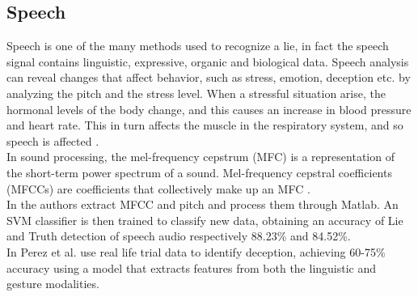 \documentclass[LaM,binding=0.6cm,english,noexaminfo]{sapthesis}
\begin{document}
\subsection*{Speech}
Speech is one of the many methods used to recognize a lie, in fact the speech signal contains linguistic, expressive, organic and biological data. Speech analysis can reveal changes that affect behavior, such as stress, emotion, deception etc. by analyzing the pitch and the stress level. When a stressful situation arise, the hormonal levels of the body change, and this causes an increase in blood pressure and heart rate. This in turn affects the muscle in the respiratory system, and so speech is affected \cite{norena}. \\
 In sound processing, the mel-frequency cepstrum (MFC) is a representation of the short-term power spectrum of a sound. Mel-frequency cepstral coefficients (MFCCs) are coefficients that collectively make up an MFC \cite{wiki:mfcc}. \\
 In \cite{relidss} the authors extract MFCC and pitch and process them through Matlab. An SVM classifier is then trained to classify new data, obtaining an accuracy of Lie and Truth detection of speech audio respectively 88.23\% and 84.52\%. \\
In \cite{Perez-Rosas:2015:DDU:2818346.2820758} \cite{Mihalcea:2013:ADD:2522848.2522888} Perez et al. use real life trial data to identify deception, achieving 60-75\% accuracy using a model that extracts features from both the linguistic and gesture modalities.
 
\end{document}
